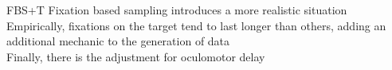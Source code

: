 \documentclass{beamer}
\begin{document}
%
%
%
%
%

\begin{frame}{FBS+T}
Fixation based sampling introduces a more realistic situation \newline \\

Empirically, fixations on the target tend to last longer than others, adding an additional mechanic to the generation of data \newline \\

Finally, there is the adjustment for oculomotor delay


\end{frame}
\end{document}
